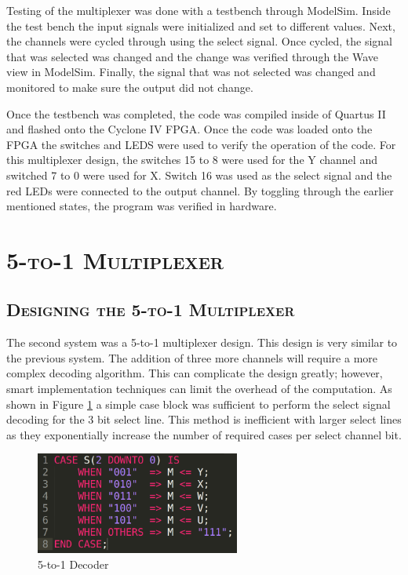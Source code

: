 \documentclass[11pt]{report}
\begin{document}
\begin{spacing}{1.5}
Testing of the multiplexer was done with a testbench through ModelSim.  Inside the test bench the input signals were initialized and set to different values.  Next, the channels were cycled through using the select signal.  Once cycled, the signal that was selected was changed and the change was verified through the Wave view in ModelSim.  Finally, the signal that was not selected was changed and monitored to make sure the output did not change.

Once the testbench was completed, the code was compiled inside of Quartus II and flashed onto the Cyclone IV FPGA.  Once the code was loaded onto the FPGA the switches and LEDS were used to verify the operation of the code.  For this multiplexer design, the switches 15 to 8 were used for the Y channel and switched 7 to 0 were used for X.  Switch 16 was used as the select signal and the red LEDs were connected to the output channel.  By toggling through the earlier mentioned states, the program was verified in hardware.

\section{\scshape 5-to-1 Multiplexer} %
\label{sec:5to1}

\subsection{\scshape Designing the 5-to-1 Multiplexer} %
\label{sub:design_5to1}

The second system was a 5-to-1 multiplexer design.  This design is very similar to the previous system.  The addition of three more channels will require a more complex decoding algorithm.  This can complicate the design greatly; however, smart implementation techniques can limit the overhead of the computation.  As shown in Figure \ref{fig:5to1code} a simple case block was sufficient to perform the select signal decoding for the 3 bit select line.  This method is inefficient with larger select lines as they exponentially increase the number of required cases per select channel bit.

\vspace{30px}
\begin{figure}[H]
    \centering
    \includegraphics[width=0.6\textwidth]{5to1Code}
    \caption{5-to-1 Decoder}
    \label{fig:5to1code}
\end{figure}


\end{spacing}
\end{document}
